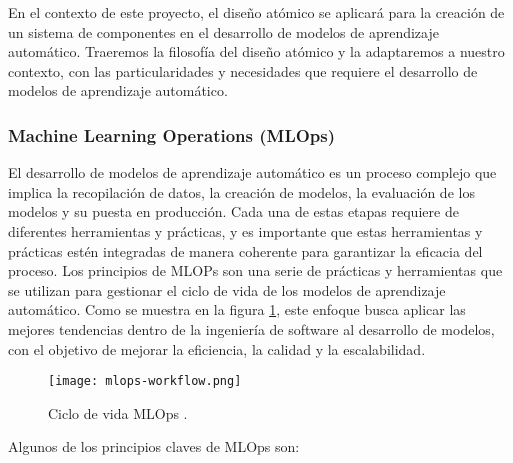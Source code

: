 En el contexto de este proyecto, el diseño atómico se aplicará para la creación de un
sistema de componentes en el desarrollo de modelos de aprendizaje automático.
Traeremos la filosofía del diseño atómico y la adaptaremos a nuestro contexto,
con las particularidades y necesidades que requiere el desarrollo de modelos de
aprendizaje automático.

\subsubsection{Machine Learning Operations (MLOps)}
El desarrollo de modelos de aprendizaje automático es un proceso complejo que implica
la recopilación de datos, la creación de modelos, la evaluación de los modelos y su
puesta en producción. Cada una de estas etapas requiere de diferentes herramientas y
prácticas, y es importante que estas herramientas y prácticas estén integradas de manera
coherente para garantizar la eficacia del proceso. Los principios de MLOPs son una serie de prácticas y herramientas que se utilizan
para gestionar el ciclo de vida de los modelos de aprendizaje automático. Como se muestra en la
figura \ref{fig:mlops-workflow}, este enfoque busca aplicar las mejores tendencias dentro de la 
ingeniería de software al desarrollo de modelos, con el objetivo de mejorar la eficiencia, la 
calidad y la escalabilidad.\medskip

\begin{figure}[ht]
    \centering
    \texttt{[image: mlops-workflow.png]}
    \caption{Ciclo de vida MLOps \cite{Merritt_2020}.}\label{fig:mlops-workflow}
\end{figure}

Algunos de los principios claves de MLOps son:

